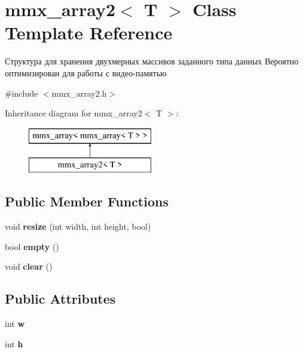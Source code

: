 \hypertarget{classmmx__array2}{\section{mmx\+\_\+array2$<$ T $>$ Class Template Reference}
\label{classmmx__array2}
}


Структура для хранения двухмерных массивов заданного типа данных Вероятно оптимизирован для работы с видео-\/памятью  




{\ttfamily \#include $<$mmx\+\_\+array2.\+h$>$}

Inheritance diagram for mmx\+\_\+array2$<$ T $>$\+:\begin{figure}[H]
\begin{center}
\leavevmode
\includegraphics[height=2.000000cm]{classmmx__array2}
\end{center}
\end{figure}
\subsection*{Public Member Functions}
\begin{DoxyCompactItemize}
\item 
\hypertarget{classmmx__array2_ab91171378bb852edb5c539ff9f1b1ba0}{void {\bfseries resize} (int width, int height, bool)}\label{classmmx__array2_ab91171378bb852edb5c539ff9f1b1ba0}

\item 
\hypertarget{classmmx__array2_a5fa7fe8a409091b6d1ae664a80552307}{bool {\bfseries empty} ()}\label{classmmx__array2_a5fa7fe8a409091b6d1ae664a80552307}

\item 
\hypertarget{classmmx__array2_a67c8a4790849f483deb9a7113f78a178}{void {\bfseries clear} ()}\label{classmmx__array2_a67c8a4790849f483deb9a7113f78a178}

\end{DoxyCompactItemize}
\subsection*{Public Attributes}
\begin{DoxyCompactItemize}
\item 
\hypertarget{classmmx__array2_aaa57fdc3151aefd7e9019db52310e222}{int {\bfseries w}}\label{classmmx__array2_aaa57fdc3151aefd7e9019db52310e222}

\item 
\hypertarget{classmmx__array2_a5466374e097f5bb0b5999cf25a813155}{int {\bfseries h}}\label{classmmx__array2_a5466374e097f5bb0b5999cf25a813155}

\end{DoxyCompactItemize}


